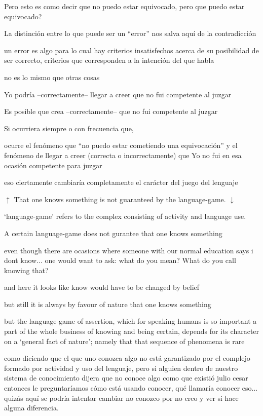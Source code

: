 Pero esto es como decir que no puedo estar equivocado, pero que puedo estar equivocado?

La distinción entre lo que puede ser un ``error'' nos salva aquí de la contradicción

un error es algo para lo cual hay criterios insatisfechos acerca de su posibilidad de ser correcto, criterios que corresponden a la intención del que habla

no es lo mismo que otras cosas

Yo podría --correctamente-- llegar a creer que no fui competente al juzgar

Es posible que crea --correctamente-- que no fui competente al juzgar

Si ocurriera siempre o con frecuencia que,

ocurre el fenómeno
que ``no puedo estar cometiendo una equivocación''
y el fenómeno de
llegar a creer (correcta o incorrectamente) que Yo no fui en esa ocasión competente para juzgar

eso ciertamente cambiaría completamente el carácter del juego del lenguaje

$\uparrow$
That one knows something is not guaranteed by the language-game.
$\downarrow$

`language-game' refers to the complex consisting of activity and language use.

A certain language-game does not gurantee that one knows something

even though
there are ocasions where someone with our normal education says i dont know... one would want to ask: what do you mean? What do you call knowing that?

and here it looks like know would have to be changed by belief

  but still it is always by favour of nature that one knows something

  but the language-game of assertion, which for speaking humans is so important a part of the whole business of knowing and being certain, depends for its character on a `general fact of nature'; namely that that sequence of phenomena is rare

  como diciendo que el que uno conozca algo no está garantizado por el complejo formado por actividad y uso del lenguaje, pero si alguien dentro de nuestro sistema de conocimiento dijera que no conoce algo como que existió julio cesar entonces le preguntaríamos cómo está usando conocer, qué llamaría conocer eso... quizás aquí se podría intentar cambiar no conozco por no creo y ver si hace alguna diferencia.

